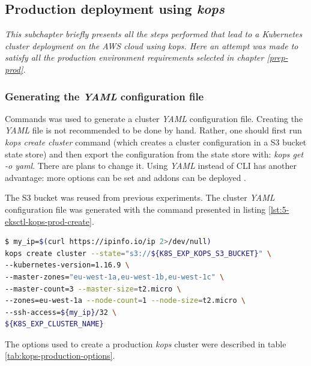 
\subsection{Production deployment using \textit{kops}}
\textit{This subchapter briefly presents all the steps performed that lead to a Kubernetes cluster deployment on the AWS cloud using \textit{kops}. Here an attempt was made to satisfy all the production environment requirements selected in chapter \ref{prep-prod}.}
\\

\subsubsection{Generating the \textit{YAML} configuration file}
Commands was used to generate a cluster \textit{YAML} configuration file. Creating the \textit{YAML} file is not recommended to be done by hand. Rather, one should first run \textit{kops create cluster} command (which creates a cluster configuration in a S3 bucket state store) and then export the configuration from the state store with: \textit{kops get -o yaml}. There are plans to change it. Using \textit{YAML} instead of CLI has another advantage: more options can be set \cite{online-kops-manifest} and addons can be deployed \cite{online-kops-addons}.

The S3 bucket was reused from previous experiments. The cluster \textit{YAML} configuration file was generated with the command presented in listing \ref{lst:5-eksctl-kops-prod-create}.
\begin{lstlisting}[basicstyle=\scriptsize,xleftmargin=0cm,label=lst:5-eksctl-kops-prod-create,caption={Commands used to generate a cluster configuration with \textit{kops}},captionpos=b,language=Bash]
$ my_ip=$(curl https://ipinfo.io/ip 2>/dev/null)
kops create cluster --state="s3://${K8S_EXP_KOPS_S3_BUCKET}" \
--kubernetes-version=1.16.9 \
--master-zones="eu-west-1a,eu-west-1b,eu-west-1c" \
--master-count=3 --master-size=t2.micro \
--zones=eu-west-1a --node-count=1 --node-size=t2.micro \
--ssh-access=${my_ip}/32 \
${K8S_EXP_CLUSTER_NAME}
\end{lstlisting}

The options used to create a production \textit{kops} cluster were described in table \ref{tab:kops-production-options}.


